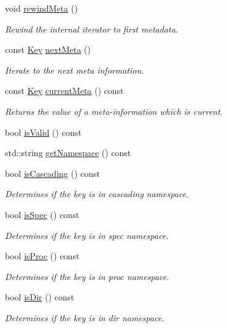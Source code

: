 \begin{DoxyCompactItemize}
void \hyperlink{classkdb_1_1Key_a002af206119ceed17b106e2449cedc91}{rewind\+Meta} ()
\begin{DoxyCompactList}\small\item\em Rewind the internal iterator to first metadata. \end{DoxyCompactList}\item 
const \hyperlink{classkdb_1_1Key}{Key} \hyperlink{classkdb_1_1Key_a855f37fef58a4ea4006d9e281f66cfe1}{next\+Meta} ()
\begin{DoxyCompactList}\small\item\em Iterate to the next meta information. \end{DoxyCompactList}\item 
const \hyperlink{classkdb_1_1Key}{Key} \hyperlink{classkdb_1_1Key_a848292bf5591e5e845f74a487697cb19}{current\+Meta} () const
\begin{DoxyCompactList}\small\item\em Returns the value of a meta-\/information which is current. \end{DoxyCompactList}\item 
bool \hyperlink{classkdb_1_1Key_a69e621790e5717c56f7275e0b8d5e27c}{is\+Valid} () const
\item 
std\+::string \hyperlink{classkdb_1_1Key_a71b191c56eacb692c2f92ed440b32b46}{get\+Namespace} () const
\item 
bool \hyperlink{classkdb_1_1Key_a024ecb6d7c87244fb83c3fee58a0d696}{is\+Cascading} () const
\begin{DoxyCompactList}\small\item\em Determines if the key is in cascading namespace. \end{DoxyCompactList}\item 
bool \hyperlink{classkdb_1_1Key_acf01e9a60bbd0e2768be782d149ac700}{is\+Spec} () const
\begin{DoxyCompactList}\small\item\em Determines if the key is in spec namespace. \end{DoxyCompactList}\item 
bool \hyperlink{classkdb_1_1Key_aa89cffb4d2a623920ff9abc086fde241}{is\+Proc} () const
\begin{DoxyCompactList}\small\item\em Determines if the key is in proc namespace. \end{DoxyCompactList}\item 
bool \hyperlink{classkdb_1_1Key_a0c60f261479e4e21cc5e9acd76c0d26b}{is\+Dir} () const
\begin{DoxyCompactList}\small\item\em Determines if the key is in dir namespace. \end{DoxyCompactList}\item 

\end{DoxyCompactItemize}
